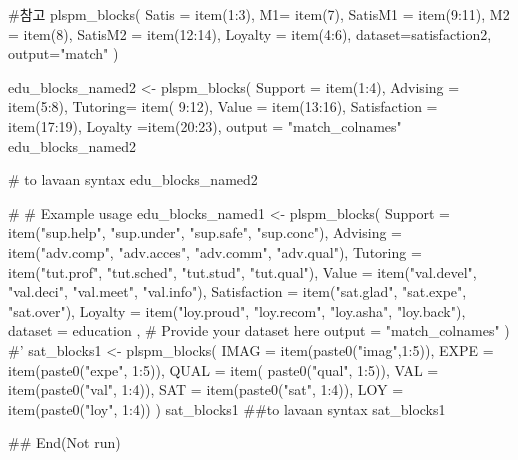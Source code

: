 \documentclass[a4paper]{book}
\begin{document}
\begin{Examples}
\begin{ExampleCode}
#참고
plspm_blocks(
  Satis = item(1:3),
  M1= item(7),
  SatisM1 = item(9:11),
  M2 = item(8),
  SatisM2 = item(12:14),
  Loyalty = item(4:6),
  dataset=satisfaction2,
  output="match"
)



edu_blocks_named2 <- plspm_blocks(
  Support = item(1:4),
  Advising = item(5:8),
  Tutoring= item( 9:12),
  Value = item(13:16),
  Satisfaction = item(17:19),
  Loyalty =item(20:23),
  output = "match_colnames"
edu_blocks_named2

# to lavaan syntax
edu_blocks_named2 %

# # Example usage
edu_blocks_named1 <- plspm_blocks(
  Support = item("sup.help", "sup.under", "sup.safe", "sup.conc"),
  Advising = item("adv.comp", "adv.acces", "adv.comm", "adv.qual"),
  Tutoring = item("tut.prof", "tut.sched", "tut.stud", "tut.qual"),
  Value = item("val.devel", "val.deci", "val.meet", "val.info"),
  Satisfaction = item("sat.glad", "sat.expe", "sat.over"),
  Loyalty = item("loy.proud", "loy.recom", "loy.asha", "loy.back"),
  dataset = education , # Provide your dataset here
  output = "match_colnames"
)
#'
sat_blocks1 <- plspm_blocks(
  IMAG = item(paste0("imag",1:5)),
  EXPE = item(paste0("expe", 1:5)),
  QUAL = item( paste0("qual", 1:5)),
  VAL = item(paste0("val", 1:4)),
  SAT = item(paste0("sat", 1:4)),
  LOY = item(paste0("loy", 1:4))
)
sat_blocks1
##to lavaan syntax
sat_blocks1 %




## End(Not run)

\end{ExampleCode}
\end{Examples}
\end{document}
